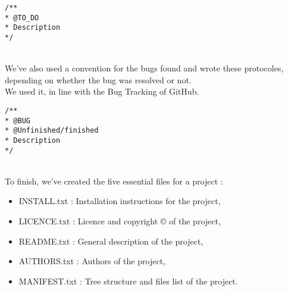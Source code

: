 \begin{lstlisting}[frame=trBL, title=Programming convention for unfinished code]
/**
* @TO_DO
* Description
*/
\end{lstlisting}
~\\
We've also used a convention for the bugs found and wrote these protocoles, depending on whether the bug was resolved or not.\\
We used it, in line with the Bug Tracking of GitHub.\\

\begin{lstlisting}[frame=trBL, title=Programming convention for bugs]
/**
* @BUG
* @Unfinished/finished
* Description
*/
\end{lstlisting}
~\\
To finish, we've created the five essential files for a project : \\
\begin{itemize}
\item INSTALL.txt  : Installation instructions for the project,
\item LICENCE.txt  : Licence and copyright \copyright{} of the project,
\item README.txt   : General description of the project,
\item AUTHORS.txt  : Authors of the project,
\item MANIFEST.txt : Tree structure and files list of the project.
\end{itemize}

